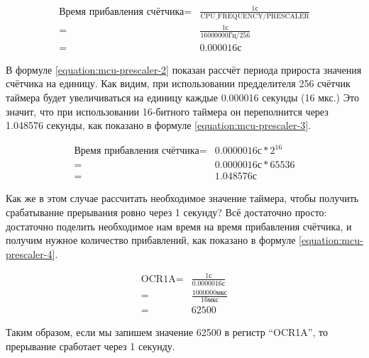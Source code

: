 \documentclass[../sparc.tex]{subfiles}
\begin{document}
\begin{align}
  \mbox{Время прибавления счётчика} =& \frac{1 \mbox{с}}{\mbox{CPU\_FREQUENCY} / \mbox{PRESCALER}} \nonumber \\
  =& \frac{1 \mbox{с}}{16000000 \mbox{Гц} / 256} \nonumber \\
  =& 0.000016 \mbox{с}
  \label{equation:mcu-prescaler-2}
\end{align}

В формуле \ref{equation:mcu-prescaler-2} показан рассчёт периода прироста
значения счётчика на единицу.  Как видим, при использовании предделителя 256
счётчик таймера будет увеличиваться на единицу каждые 0.000016 секунды (16 мкс.)
Это значит, что при использовании 16-битного таймера он переполнится через
1.048576 секунды, как показано в формуле \ref{equation:mcu-prescaler-3}.

\begin{align}
  \mbox{Время прибавления счётчика} =& 0.0000016\mbox{с} * 2^{16} \nonumber \\
  =& 0.0000016\mbox{с} * 65536 \nonumber \\
  =& 1.048576\mbox{с}
  \label{equation:mcu-prescaler-3}
\end{align}

Как же в этом случае рассчитать необходимое значение таймера, чтобы получить
срабатывание прерывания ровно через 1 секунду?  Всё достаточно просто:
достаточно поделить необходимое нам время на время прибавления счётчика, и
получим нужное количество прибавлений, как показано в формуле
\ref{equation:mcu-prescaler-4}.

\begin{align}
  \mbox{OCR1A} =& \frac{1\mbox{с}}{0.0000016\mbox{с}} \nonumber \\
  =& \frac{1000000\mbox{мкс}}{16\mbox{мкс}} \nonumber \\
  =& 62500
  \label{equation:mcu-prescaler-4}
\end{align}

Таким образом, если мы запишем значение 62500 в регистр ``OCR1A'', то прерывание
сработает через 1 секунду.
\end{document}
